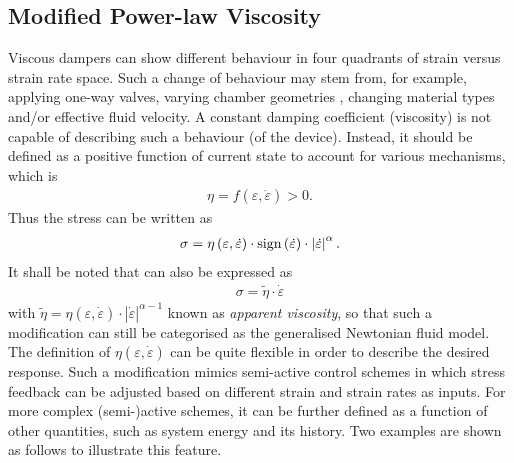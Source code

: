 \subsection{Modified Power-law Viscosity}
Viscous dampers can show different behaviour in four quadrants of strain versus strain rate space. Such a change of behaviour may stem from, for example, applying one-way valves, varying chamber geometries \cite{Hazaveh2017}, changing material types \cite{Lu2018} and/or effective fluid velocity. A constant damping coefficient (viscosity) is not capable of describing such a behaviour (of the device). Instead, it should be defined as a positive function of current state to account for various mechanisms, which is
\begin{gather}
\eta=f\left(\varepsilon,\dot\varepsilon\right)>0.
\end{gather}
Thus the stress can be written as
\begin{gather}\label{eq:quadrant_damper_govern}
\sigma=\eta\left(\varepsilon,\dot\varepsilon\right)\cdot\text{sign}\left(\dot{\varepsilon}\right)\cdot\left\lvert\dot{\varepsilon}\right\rvert^{\alpha}.
\end{gather}
It shall be noted that  can also be expressed as
\begin{gather}
\sigma=\tilde{\eta}\cdot\dot{\varepsilon}
\end{gather}
with $\tilde{\eta}=\eta\left(\varepsilon,\dot\varepsilon\right)\cdot\left\lvert\dot{\varepsilon}\right\rvert^{\alpha-1}$ known as \textit{apparent viscosity}, so that such a modification can still be categorised as the generalised Newtonian fluid model.
The definition of $\eta\left(\varepsilon,\dot\varepsilon\right)$ can be quite flexible in order to describe the desired response. Such a modification mimics semi-active control schemes in which stress feedback can be adjusted based on different strain and strain rates as inputs. For more complex (semi-)active schemes, it can be further defined as a function of other quantities, such as system energy and its history. Two examples are shown as follows to illustrate this feature.
